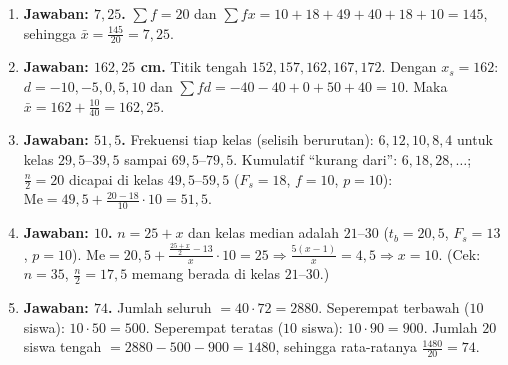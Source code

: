 \documentclass[a4paper,11pt]{article}
\newcommand{\dis}{\displaystyle}
\newcommand{\Me}{\mathrm{Me}}
\newcounter{no}
\begin{document}
\par{}\par\vspace{0.2em}
\small\begin{enumerate}[leftmargin=2em,itemsep=2pt,topsep=2pt]
\item[\textbf{1.}] \textbf{Jawaban: $7{,}25$.} $\sum f=20$ dan $\sum fx=10+18+49+40+18+10=145$, sehingga $\bar{x}=\dis\frac{145}{20}=7{,}25$.
\item[\textbf{2.}] \textbf{Jawaban: $162{,}25$ cm.} Titik tengah $152,157,162,167,172$. Dengan $x_s=162$: $d=-10,-5,0,5,10$ dan $\sum fd=-40-40+0+50+40=10$. Maka $\bar{x}=162+\dis\frac{10}{40}=162{,}25$.
\item[\textbf{3.}] \textbf{Jawaban: $51{,}5$.} Frekuensi tiap kelas (selisih berurutan): $6,12,10,8,4$ untuk kelas $29{,}5$--$39{,}5$ sampai $69{,}5$--$79{,}5$. Kumulatif ``kurang dari'': $6,18,28,\dots$; $\dis\frac n2=20$ dicapai di kelas $49{,}5$--$59{,}5$ ($F_s=18$, $f=10$, $p=10$): $\Me=49{,}5+\dis\frac{20-18}{10}\cdot10=51{,}5$.
\item[\textbf{4.}] \textbf{Jawaban: $10$.} $n=25+x$ dan kelas median adalah $21$--$30$ ($t_b=20{,}5$, $F_s=13$, $p=10$). $\Me=20{,}5+\dis\frac{\frac{25+x}{2}-13}{x}\cdot10=25\Rightarrow\dis\frac{5(x-1)}{x}=4{,}5\Rightarrow x=10$. (Cek: $n=35$, $\frac n2=17{,}5$ memang berada di kelas $21$--$30$.)
\item[\textbf{5.}] \textbf{Jawaban: $74$.} Jumlah seluruh $=40\cdot72=2880$. Seperempat terbawah ($10$ siswa): $10\cdot50=500$. Seperempat teratas ($10$ siswa): $10\cdot90=900$. Jumlah $20$ siswa tengah $=2880-500-900=1480$, sehingga rata-ratanya $\dis\frac{1480}{20}=74$.
\end{enumerate}
\par{}\par\vspace{0.2em}
\end{document}
